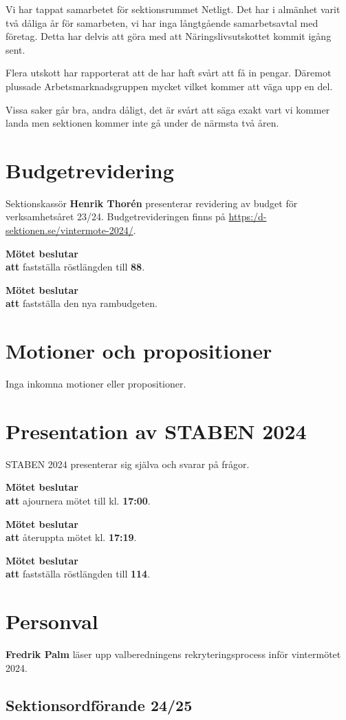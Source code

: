 \documentclass{datateknologsektionen-document}
\newcommand{\ind}{\hspace*{2em}}
\newcommand{\motetbeslutar}{\textbf{Mötet beslutar}}
\newcommand{\att}{\\\ind\textbf{att}}
\newcommand{\rostlangd}[1]{\motetbeslutar\att{} fastställa röstlängden till \textbf{#1}.}
\begin{document}
Vi har tappat samarbetet för sektionsrummet Netligt. Det har i almänhet varit två dåliga år för samarbeten, vi har inga långtgående samarbetsavtal med företag. Detta har delvis att göra med att Näringslivsutskottet kommit igång sent.

Flera utskott har rapporterat att de har haft svårt att få in pengar. Däremot plussade Arbetsmarknadsgruppen mycket vilket kommer att väga upp en del.

Vissa saker går bra, andra dåligt, det är svårt att säga exakt vart vi kommer landa men sektionen kommer inte gå under de närmsta två åren.

\section{Budgetrevidering}
Sektionskassör \textbf{Henrik Thorén} presenterar revidering av budget för verksamhetsåret 23/24. Budgetrevideringen finns på \url{https:/d-sektionen.se/vintermote-2024/}.

\rostlangd{88}

\motetbeslutar\att{} fastställa den nya rambudgeten.


\section{Motioner och propositioner}

Inga inkomna motioner eller propositioner.


\section{Presentation av STABEN 2024}

STABEN 2024 presenterar sig själva och svarar på frågor.

\motetbeslutar\att{} ajournera mötet till kl. \textbf{17:00}.

\motetbeslutar\att{} återuppta mötet kl. \textbf{17:19}.

\rostlangd{114}

\pagebreak
\section{Personval}

\textbf{Fredrik Palm} läser upp valberedningens rekryteringsprocess inför vintermötet 2024.

\subsection{Sektionsordförande 24/25}
\end{document}
